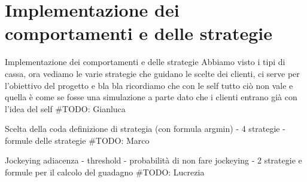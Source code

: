 \section{Implementazione dei comportamenti e delle strategie}
\begin{frame}{Implementazione dei comportamenti e delle strategie}
	\centering
	Abbiamo visto i tipi di cassa, ora vediamo le varie strategie che guidano le scelte dei clienti, ci serve per l'obiettivo del progetto e bla bla
	ricordiamo che con le self tutto ciò non vale e quella è come se fosse una simulazione a parte dato che i clienti entrano già con l'idea del self
	\#TODO: Gianluca
\end{frame}

\begin{frame}{Scelta della coda}
	\centering
	definizione di strategia (con formula argmin) - 4 strategie - formule delle strategie
	\#TODO: Marco

\end{frame}

\begin{frame}{Jockeying}
	\centering
	adiacenza - threshold - probabilità di non fare jockeying - 2 strategie e formule per il calcolo del guadagno
	\#TODO: Lucrezia
\end{frame}
